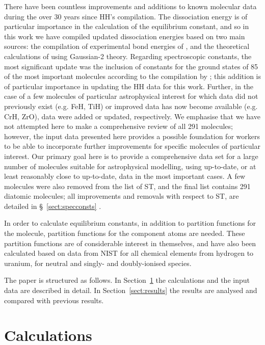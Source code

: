 \documentclass[traditabstract]{aa} %
\begin{document}
There have been countless improvements and additions to known molecular data during the over 30 years since HH's compilation.  The dissociation energy is of particular importance in the calculation of the equilibrium constant, and so in this work we have compiled updated dissociation energies based on two main sources: the compilation of experimental bond energies of \cite{Luo}, and the theoretical calculations of \cite{1991JChPh..94.7221C} using Gaussian-2 theory.  Regarding spectroscopic constants, the most significant update was the inclusion of constants for the ground states of 85 of the most important molecules according to the compilation by \cite{2007JPCRD..36..389I}; this addition is of particular importance in updating the HH data for this work.  Further, in the case of a few molecules of particular astrophysical interest for which data did not previously exist (e.g. FeH, TiH) or improved data has now become available (e.g. CrH, ZrO), data were added or updated, respectively.  We emphasise that we have not attempted here to make a comprehensive review of all 291 molecules; however, the input data presented here provides a possible foundation for workers to be able to incorporate further improvements for specific molecules of particular interest.  Our primary goal here is to provide a comprehensive data set for a large number of molecules suitable for astrophysical modelling, using up-to-date, or at least reasonably close to up-to-date, data in the most important cases. A few molecules were also removed from the list of ST, and the final list contains 291 diatomic molecules; all improvements and removals with respect to ST, are detailed in \S~\ref{sect:specconsts} .

In order to calculate equilibrium constants, in addition to partition functions for the molecule, partition functions for the component atoms are needed.  These partition functions are of considerable interest in themselves, and have also been calculated based on data from NIST for all chemical elements from hydrogen to uranium, for neutral and singly- and doubly-ionised species. 

The paper is structured as follows.  In Section~\ref{sect:calc} the calculations and the input data are described in detail.  In Section~\ref{sect:results} the results are analysed and compared with previous results.

\section{Calculations}
\label{sect:calc}
\end{document}
